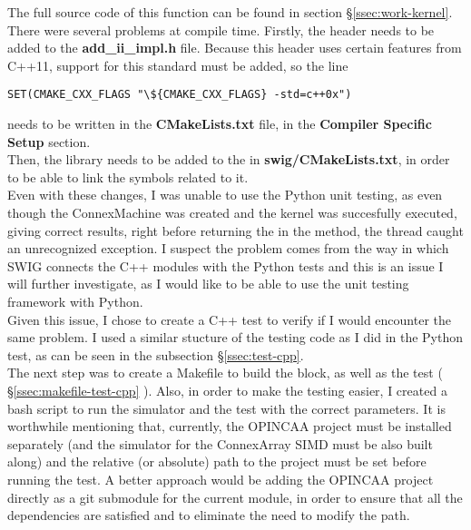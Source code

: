 The full source code of this function can be found in section
\S\ref{ssec:work-kernel}.\\

There were several problems at compile time. Firstly, the
 header needs to be added to the
\textbf{add\_ii\_impl.h} file. Because this header uses certain features from
C++11, support for this standard must be added, so the line

\begin{lstlisting}
SET(CMAKE_CXX_FLAGS "\${CMAKE_CXX_FLAGS} -std=c++0x")
\end{lstlisting}

needs to be written in the \textbf{CMakeLists.txt} file, in the \textbf{Compiler
Specific Setup} section.\\

Then, the  library needs to be added to the
 in \textbf{swig/CMakeLists.txt}, in order to be
able to link the symbols related to it.\\

Even with these changes, I was unable to use the Python unit testing, as even
though the ConnexMachine was created and the kernel was succesfully executed,
giving correct results, right before returning the  in
the  method, the thread caught an unrecognized exception. I suspect
the problem comes from the way in which SWIG connects the C++ modules with the
Python tests and this is an issue I will further investigate, as I would like
to be able to use the unit testing framework with Python.\\

Given this issue, I chose to create a C++ test to verify if I would encounter the
same problem. I used a similar stucture of the testing code as I did in the
Python test, as can be seen in the subsection \S\ref{ssec:test-cpp}. \\

The next step was to create a Makefile to build the block, as well as the test
( \S\ref{ssec:makefile-test-cpp} ). Also, in order to make the testing easier, I
created a bash script to run the simulator and the test with the correct
parameters. It is worthwhile mentioning that, currently, the OPINCAA project
must be installed separately (and the simulator for the ConnexArray SIMD must
be also built along) and the relative (or absolute) path to the project must
be set before running the test. A better approach would be adding the OPINCAA
project directly as a git submodule for the current module, in order to ensure
that all the dependencies are satisfied and to eliminate the need to modify
the path. \\

